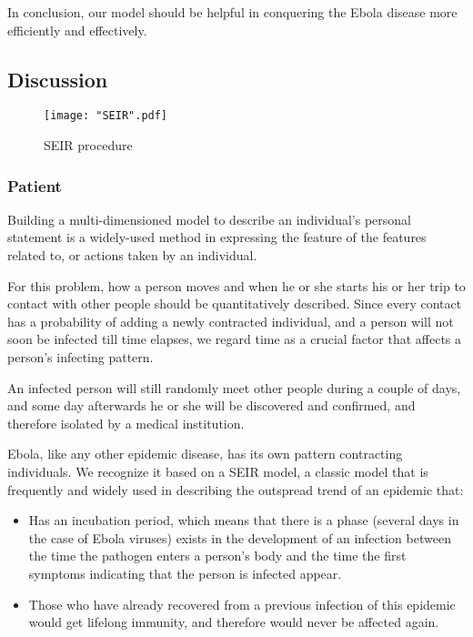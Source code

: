 \documentclass[11pt]{article}
\begin{document}
In conclusion, our model should be helpful in conquering the Ebola disease more efficiently and effectively.

\subsection{Discussion}%

\begin{figure}[t]
\centerline{\texttt{[image: "SEIR".pdf]}}
\caption{SEIR procedure}
\label{SEIR}
\end{figure}

\subsubsection{Patient}

Building a multi-dimensioned model to describe an individual’s personal statement is a widely-used method in expressing the feature of the features related to, or actions taken by an individual.

For this problem, how a person moves and when he or she starts his or her trip to contact with other people should be quantitatively described. Since every contact has a probability of adding a newly contracted individual, and a person will not soon be infected till time elapses, we regard time as a crucial factor that affects a person’s infecting pattern.

An infected person will still randomly meet other people during a couple of days, and some day afterwards he or she will be discovered and confirmed, and therefore isolated by a medical institution.

Ebola, like any other epidemic disease, has its own pattern contracting individuals. We recognize it based on a SEIR model, a classic model that is frequently and widely used in describing the outspread trend of an epidemic that:
\begin{itemize}
\item Has an incubation period, which means that there is a phase (several days in the case of Ebola viruses) exists in the development of an infection between the time the pathogen enters a person's body and the time the first symptoms indicating that the person is infected appear.

\item Those who have already recovered from a previous infection of this epidemic would get lifelong immunity, and therefore would never be affected again.

\end{itemize}
\end{document}
